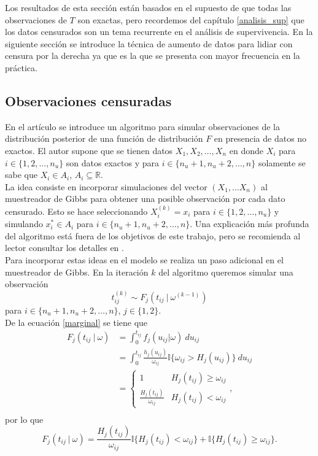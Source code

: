 \documentclass[11pt,a4paper]{article}
\begin{document}
Los resultados de esta sección están basados en el supuesto de que todas las observaciones de $T$ son exactas, pero recordemos del capítulo \ref{analisis_sup} que los datos censurados son un tema recurrente en el análisis de supervivencia. En la siguiente sección se introduce la técnica de aumento de datos para lidiar con censura por la derecha ya que es la que se presenta con mayor frecuencia en la práctica.\\

\subsection{Observaciones censuradas}

En el artículo \citet{doss_sampling} se introduce un algoritmo para simular observaciones de la distribución posterior de una función de distribución $F$ en presencia de datos no exactos. El autor supone que se tienen datos $X_1, X_2, \dots, X_n$ en donde $X_i$ para $i \in \lbrace 1, 2, \dots, n_u \rbrace$ son datos exactos y para $ i \in \lbrace n_u+1, n_u + 2, \dots, n \rbrace$ solamente se sabe que $X_i \in A_i$, $A_i \subseteq \mathbb{R}.$\\

La idea consiste en incorporar simulaciones del vector $(X_1, \dots X_n)$ al muestreador de Gibbs para obtener una posible observación por cada dato censurado. Esto se hace seleccionando $X_i^{(k)} = x_i$ para $i \in \lbrace 1, 2, \dots, n_u \rbrace$ y simulando $x^*_i \in A_i$ para $ i \in \lbrace n_u+1, n_u + 2, \dots, n \rbrace$. Una explicación más profunda del algoritmo está fuera de los objetivos de este trabajo, pero se recomienda al lector consultar los detalles en \citet{doss_sampling}.\\

Para incorporar estas ideas en el modelo se realiza un paso adicional en el muestreador de Gibbs. En la iteración $k$ del algoritmo queremos simular una observación
\begin{equation} \label{paso_censura}
t_{ij}^{(k)} \sim F_j(t_{ij} \ | \  \omega^{(k-1)})
\end{equation}
para $ i \in \lbrace n_u+1, n_u + 2, \dots, n \rbrace$, $j \in \lbrace 1, 2 \rbrace.$\\

De la ecuación \eqref{marginal} se tiene que
\begin{align*}
F_j(t_{ij} \ | \ \omega) &= \int_0^{t_{ij}} f_j(u_{ij}|\omega) \ du_{ij}\\
&= \int_0^{t_{ij}} \frac{h_j(u_{ij})}{\omega_{ij}} \mathbb{I}\lbrace \omega_{ij} > H_j(u_{ij}) \rbrace \ du_{ij}\\
&= \begin{cases} 
      1 & H_j(t_{ij}) \geq \omega_{ij}\\
      \frac{H_j(t_{ij})}{\omega_{ij}} & H_j(t_{ij}) < \omega_{ij}
   \end{cases},\\
\end{align*}
por lo que $$F_j(t_{ij} \ | \ \omega) = \frac{H_j(t_{ij})}{\omega_{ij}} \mathbb{I} \lbrace H_j(t_{ij}) < \omega_{ij} \rbrace + \mathbb{I}\lbrace H_j(t_{ij}) \geq \omega_{ij} \rbrace.$$\\
\end{document}
